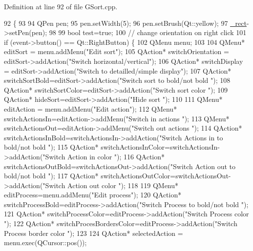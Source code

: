 Definition at line 92 of file G\+Sort.\+cpp.


\begin{DoxyCode}
92                                                            \{
93 
94     QPen pen;
95     pen.setWidth(5);
96     pen.setBrush(Qt::yellow);
97     \hyperlink{classGSort_aa5979b4b0c0e9efbccce0de13ded38d8}{\_rect}->setPen(pen);
98 
99     \textcolor{keywordtype}{bool} test=\textcolor{keyword}{true};
100     \textcolor{comment}{// change orientation on right click}
101     \textcolor{keywordflow}{if} (event->button() == Qt::RightButton) \{
102         QMenu menu;
103 
104         QMenu* editSort = menu.addMenu(\textcolor{stringliteral}{"Edit sort"});
105         QAction* switchOrientation = editSort->addAction(\textcolor{stringliteral}{"Switch horizontal/vertical"});
106         QAction* switchDisplay = editSort->addAction(\textcolor{stringliteral}{"Switch to detailled/simple display"});
107         QAction* switchSortBold=editSort->addAction(\textcolor{stringliteral}{"Switch sort to bold/not bold "});
108         QAction* switchSortColor=editSort->addAction(\textcolor{stringliteral}{"Switch sort color "});
109         QAction* hideSort=editSort->addAction(\textcolor{stringliteral}{"Hide sort "});
110 
111         QMenu* editAction = menu.addMenu(\textcolor{stringliteral}{"Edit action"});
112         QMenu* switchActionsIn=editAction->addMenu(\textcolor{stringliteral}{"Switch in actions "});
113         QMenu* switchActionsOut=editAction->addMenu(\textcolor{stringliteral}{"Switch out actions "});
114         QAction* switchActionsInBold=switchActionsIn->addAction(\textcolor{stringliteral}{"Switch Actions in to bold/not bold "});
115         QAction* switchActionsInColor=switchActionsIn->addAction(\textcolor{stringliteral}{"Switch Action in color "});
116         QAction* switchActionsOutBold=switchActionsOut->addAction(\textcolor{stringliteral}{"Switch Action out to bold/not bold "});
117         QAction* switchActionsOutColor=switchActionsOut->addAction(\textcolor{stringliteral}{"Switch Action out color "});
118 
119         QMenu* editProcess=menu.addMenu(\textcolor{stringliteral}{"Edit process"});
120         QAction* switchProcessBold=editProcess->addAction(\textcolor{stringliteral}{"Switch Process to bold/not bold "});
121         QAction* switchProcessColor=editProcess->addAction(\textcolor{stringliteral}{"Switch Process color "});
122         QAction* switchProcesBordersColor=editProcess->addAction(\textcolor{stringliteral}{"Switch Process border color "});
123 
124         QAction* selectedAction = menu.exec(QCursor::pos());

\end{DoxyCode}
